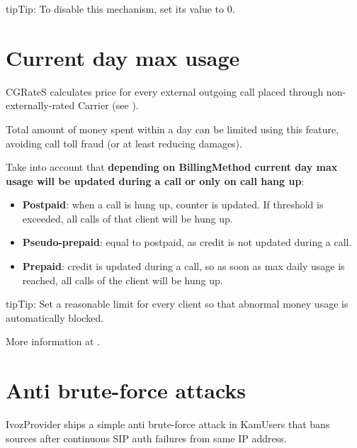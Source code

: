 \documentclass[letterpaper,10pt,english]{sphinxmanual}
\begin{document}
\begin{notice}{tip}{Tip:}
To disable this mechanism, set its value to 0.
\end{notice}


\section{Current day max usage}
\label{security_and_maintenance/security/current_day_max_usage:current-day-max-usage}\label{security_and_maintenance/security/current_day_max_usage::doc}\label{security_and_maintenance/security/current_day_max_usage:id1}
CGRateS calculates price for every external outgoing call placed through non-externally-rated Carrier (see {\hyperref[administration_portal/brand/billing/index:billing]{}}).

Total amount of money spent within a day can be limited using this feature, avoiding call toll fraud (or at least
reducing damages).

Take into account that \textbf{depending on BillingMethod current day max usage will be updated during a call or only on call hang up}:
\begin{itemize}
\item {} 
\textbf{Postpaid}: when a call is hung up, counter is updated. If threshold is exceeded, all calls of that client will be hung up.

\item {} 
\textbf{Pseudo-prepaid}: equal to postpaid, as credit is not updated during a call.

\item {} 
\textbf{Prepaid}: credit is updated during a call, so as soon as max daily usage is reached, all calls of the client will be hung up.

\end{itemize}

\begin{notice}{tip}{Tip:}
Set a reasonable limit for every client so that abnormal money usage is automatically blocked.
\end{notice}

More information at {\hyperref[administration_portal/brand/billing/current_day_usages:current\string-day\string-usages]{}}.


\section{Anti brute-force attacks}
\label{security_and_maintenance/security/antibruteforce:anti-brute-force-attacks}\label{security_and_maintenance/security/antibruteforce::doc}\label{security_and_maintenance/security/antibruteforce:id1}
IvozProvider ships a simple anti brute-force attack in KamUsers that bans sources after continuous SIP auth failures
from same IP address.
\end{document}

